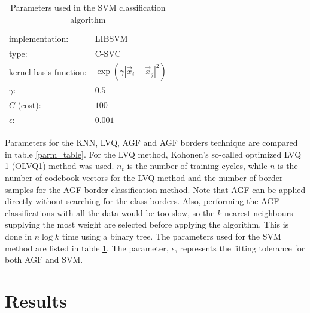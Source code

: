 \begin{table}
  \begin{center}
  \caption{Parameters used in the SVM classification algorithm}
  \begin{tabular}[h]{|ll|}\hline
    implementation: & LIBSVM \\
    type: & C-SVC \\
    kernel basis function: & $\exp(\gamma |\vec x_i - \vec x_j|^2)$ \\
    $\gamma$: & $0.5$ \\
    $C$ (cost): & $100$ \\ 
    $\epsilon$: & $0.001$ \\ \hline
  \end{tabular}
  \label{SVM_parm}
  \end{center}
\end{table}
    
Parameters for the KNN, LVQ, AGF and AGF borders technique are
compared in table \ref{parm_table}.  For the LVQ method, Kohonen's
so-called optimized LVQ 1 (OLVQ1) method was used.  $n_t$ is the 
number of training cycles, while $n$ is the number of codebook
vectors for the LVQ method and the number of border samples for
the AGF border classification method.  Note that AGF can be applied
directly without searching for the class borders.  
Also, performing the AGF classifications with all the data would
be too slow, so the $k$-nearest-neighbours supplying the most 
weight are selected before
applying the algorithm.  This is done in $n \log k$ time using a
binary tree.  The parameters used for the SVM method are listed
in table \ref{SVM_parm}.  The parameter, $\epsilon$, represents
the fitting tolerance for both AGF and SVM.

\section{Results}

